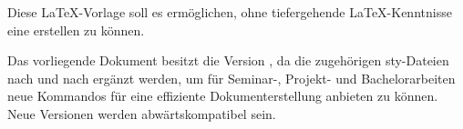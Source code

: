 Diese \LaTeX{}-Vorlage soll es erm\"oglichen, ohne tiefergehende \LaTeX-Kenntnisse 
eine \seArbeit{} erstellen zu k\"onnen.

Das vorliegende Dokument besitzt die Version \version, da die zugeh\"origen sty-Dateien 
nach und nach erg\"anzt werden, um f\"ur Seminar-, Projekt- und Bachelorarbeiten neue 
Kommandos f\"ur eine effiziente Dokumenterstellung anbieten zu k\"onnen. 
Neue Versionen werden abw\"artskompatibel sein. 
